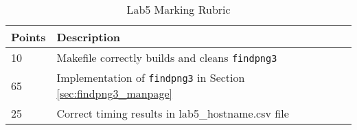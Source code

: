 \begin{table}[ht]
\begin{center}
\begin{tabular}{|p{4cm}|p{10cm}|}
\hline
Points & Description \\ \hline
10     & Makefile correctly builds and cleans \verb+findpng3+\\ \hline  
65     & Implementation of \verb+findpng3+ in Section \ref{sec:findpng3_manpage} \\ \hline
25     & Correct timing results in lab5\_hostname.csv file\\ \hline
\end{tabular}
\caption{Lab5 Marking Rubric}
\label{tb_lab5_aio_rubric}
\end{center}
\end{table}

